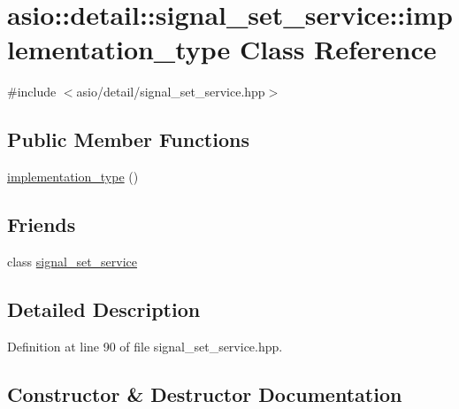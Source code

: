 \hypertarget{classasio_1_1detail_1_1signal__set__service_1_1implementation__type}{}\section{asio\+:\+:detail\+:\+:signal\+\_\+set\+\_\+service\+:\+:implementation\+\_\+type Class Reference}
\label{classasio_1_1detail_1_1signal__set__service_1_1implementation__type}


{\ttfamily \#include $<$asio/detail/signal\+\_\+set\+\_\+service.\+hpp$>$}

\subsection*{Public Member Functions}
\begin{DoxyCompactItemize}
\item 
\hyperlink{classasio_1_1detail_1_1signal__set__service_1_1implementation__type_af73e2935be6e90e7ddd757542fc6c62d}{implementation\+\_\+type} ()
\end{DoxyCompactItemize}
\subsection*{Friends}
\begin{DoxyCompactItemize}
\item 
class \hyperlink{classasio_1_1detail_1_1signal__set__service_1_1implementation__type_a4c3a636c56d1c7da28cabb117a52300b}{signal\+\_\+set\+\_\+service}
\end{DoxyCompactItemize}


\subsection{Detailed Description}


Definition at line 90 of file signal\+\_\+set\+\_\+service.\+hpp.



\subsection{Constructor \& Destructor Documentation}
\hypertarget{classasio_1_1detail_1_1signal__set__service_1_1implementation__type_af73e2935be6e90e7ddd757542fc6c62d}{}
